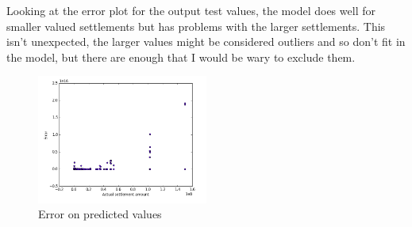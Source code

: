 \documentclass[11pt]{article}
\begin{document}
Looking at the error plot for the output test values, the model does well for smaller valued settlements but has problems with the larger settlements. This isn't unexpected, the larger values might be considered outliers and so don't fit in the model, but there are enough that I would be wary to exclude them.

\begin{figure}[h]
\centering
\caption{Error on predicted values}
\includegraphics[width=0.5\textwidth]{errplot.png}
\end{figure}
\end{document}
